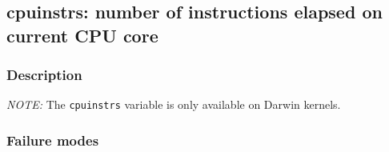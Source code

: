 \clearpage
{}
{}
\label{vars:cpuinstrs}
\subsection*{cpuinstrs: number of instructions elapsed on current CPU core}

\subsubsection*{Description}

\emph{NOTE:} The \verb|cpuinstrs| variable is only available on Darwin
kernels.

\subsubsection*{Failure modes}

